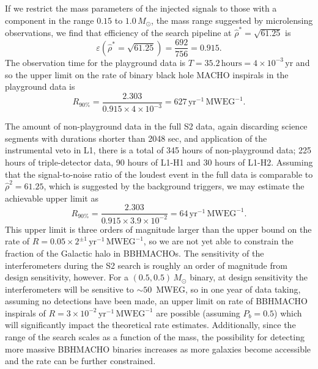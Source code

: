 If we restrict the mass parameters of the injected signals to those with a
component in the range $0.15$ to $1.0\,M_\odot$, the mass range suggested by
microlensing observations, we find that efficiency of the search pipeline at
$\hat{\rho}^\ast = \sqrt{61.25}$ is 
\begin{equation}
\varepsilon\left( \hat{\rho}^\ast = \sqrt{61.25} \right) = \frac{ 692 } { 756
} = 0.915.
\end{equation}
The observation time for the playground data is $T = 35.2\,\mathrm{hours} = 4
\times 10^{-3}\,\mathrm{yr}$ and so the upper limit on the rate of binary
black hole MACHO inspirals in the playground data is
\begin{equation}
R_{90\%} = \frac{2.303}{0.915 \times 4 \times 10^{-3}} = 
627\,\mathrm{yr}^{-1}\,\mathrm{MWEG}^{-1}.
\end{equation}

The amount of non-playground data in the full S2 data, again discarding
science segments with durations shorter than 2048 sec,  and application of the
instrumental veto in L1, there is a total of 345 hours of non-playground data;
225 hours of triple-detector data, 90 hours of L1-H1 and 30 hours of L1-H2.
Assuming that the signal-to-noise ratio of the loudest event in the full data
is comparable to $\hat{\rho}^2 = 61.25$, which is suggested by the background
triggers, we may estimate the achievable upper limit as
\begin{equation}
R_{90\%} = \frac{2.303}{0.915 \times 3.9 \times 10^{-2}} = 
64\,\mathrm{yr}^{-1}\,\mathrm{MWEG}^{-1}.
\end{equation}
This upper limit is three orders of magnitude larger than the upper bound on
the rate of $R = 0.05\times2^{\pm 1}\,\mathrm{yr}^{-1}\,\mathrm{MWEG}^{-1}$,
so we are not yet able to constrain the fraction of the Galactic halo in
BBHMACHOs. The sensitivity of the interferometers during the S2 search is
roughly an order of magnitude from design sensitivity, however. For a
$(0.5,0.5)\,M_\odot$ binary, at design sensitivity the interferometers will be
sensitive to $\sim 50$~MWEG, so in one year of data taking, assuming no
detections have been made, an upper limit on rate of BBHMACHO inspirals of $R
= 3\times10^{-2}\,\mathrm{yr}^{-1}\,\mathrm{MWEG}^{-1}$ are possible (assuming
$P_b = 0.5$) which will significantly impact the theoretical rate estimates.
Additionally, since the range of the search scales as a function of the mass,
the possibility for detecting more massive BBHMACHO binaries increases as more
galaxies become accessible and the rate can be further constrained.

